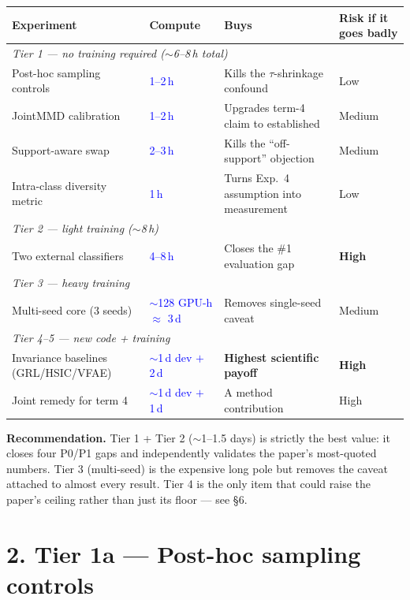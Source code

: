 \documentclass[10pt,letterpaper]{article}
\newcommand{\pj}[1]{\textcolor{blue}{#1}}
\begin{document}
\begin{table}[h]
\centering
\small
\begin{tabular}{llll}
\toprule
Experiment & Compute & Buys & Risk if it goes badly \\
\midrule
\multicolumn{4}{l}{\emph{Tier 1 --- no training required ($\sim$6--8\,h total)}}\\
Post-hoc sampling controls & \pj{1--2\,h} & Kills the $\tau$-shrinkage confound & Low \\
JointMMD calibration       & \pj{1--2\,h} & Upgrades term-4 claim to established & Medium \\
Support-aware swap         & \pj{2--3\,h} & Kills the ``off-support'' objection & Medium \\
Intra-class diversity metric & \pj{1\,h}  & Turns Exp.\ 4 assumption into measurement & Low \\
\midrule
\multicolumn{4}{l}{\emph{Tier 2 --- light training ($\sim$8\,h)}}\\
Two external classifiers & \pj{4--8\,h} & Closes the \#1 evaluation gap & \textbf{High} \\
\midrule
\multicolumn{4}{l}{\emph{Tier 3 --- heavy training}}\\
Multi-seed core ($3$ seeds) & \pj{$\sim$128 GPU-h $\approx$ 3\,d} & Removes single-seed caveat & Medium \\
\midrule
\multicolumn{4}{l}{\emph{Tier 4--5 --- new code + training}}\\
Invariance baselines (GRL/HSIC/VFAE) & \pj{$\sim$1\,d dev $+$ 2\,d} & \textbf{Highest scientific payoff} & \textbf{High} \\
Joint remedy for term 4 & \pj{$\sim$1\,d dev $+$ 1\,d} & A method contribution & High \\
\bottomrule
\end{tabular}
\end{table}

\noindent\textbf{Recommendation.} Tier 1 + Tier 2 ($\sim$1--1.5 days) is
strictly the best value: it closes four P0/P1 gaps and independently
validates the paper's most-quoted numbers. Tier 3 (multi-seed) is the
expensive long pole but removes the caveat attached to almost every result.
Tier 4 is the only item that could raise the paper's ceiling rather than
just its floor --- see \S6.

\section*{2. Tier 1a --- Post-hoc sampling controls}
\end{document}
